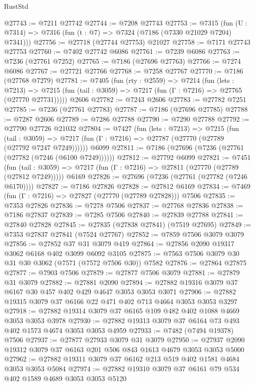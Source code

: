 \begin{lexlean}{RustStd}
\begin{coremodule}
{\begin{coremodule}
{{{{{{{{{{{{{{{{{{{{{{{{{{{{{{{{@27743 := @7211 @27742
@27744 := @7208 @27743
@27753 := @7315
    (fun (U : @7314) => @7316 (fun (t : @7) => @7324 (@7186 (@7330 @21029 @7204) @7341)))
@27756 := @27718 (@27744 @27753) @21027
@27758 := @7171 @27743 @27753
@27760 := @7402 @27742 @6086
@27761 := @7239 @6086
@27763 := @7236 (@27761 @7252)
@27765 := @7186 (@27696 @27763)
@27766 := @7274 @6086
@27767 := @27721 @27766
@27768 := @7258 @27767
@27770 := @7186 (@27768 @7279)
@27781 := @7405
    (fun (rty : @2559) =>
    @7214
      (fun (lets : @7213) =>
      @7215 (fun (tail : @3059) => @7217 (fun (Γ : @7216) => @27765 (@27770 @27731)))))
    @2606
@27782 := @7243 @2606
@27783 := @27782 @7251
@27785 := @7236 (@27761 @27783)
@27787 := @7186 (@27696 @27785)
@27788 := @7287 @2606
@27789 := @7286 @27788
@27790 := @7290 @27788
@27792 := @27790 @27726 @21032
@27804 := @7427
    (fun (lets : @7213) =>
    @7215
      (fun (tail : @3059) =>
      @7217 (fun (Γ : @7216) => @27787 (@27770 (@27789 (@27792 @7247 @7249))))))
    @6099
@27811 := @7186 (@27696 (@7236 (@27761 (@27782 (@7246 (@6100 @7249))))))
@27812 := @27792 @6099
@27821 := @7451
    (fun (tail : @3059) => @7217 (fun (Γ : @7216) => @27811 (@27770 (@27789 (@27812 @7249)))))
    @6169
@27826 := @27696 (@7236 (@27761 (@27782 (@7246 @6170))))
@27827 := @7186 @27826
@27828 := @27812 @6169
@27834 := @7469 (fun (Γ : @7216) => @27827 (@27770 (@27789 @27828))) @7506
@27835 := @7353 @27826
@27836 := @7278 @7506
@27837 := @27768 @27836
@27838 := @7186 @27837
@27839 := @7285 @7506
@27840 := @27839 @27788
@27841 := @27840 @27828
@27845 := @27835 (@27838 @27841) (@7519 @27695)
@27849 := @7353 @27837 @27841 (@7524 @27767)
@27852 := @7859 @7506 @3079 @3079
@27856 := @27852 @37 @31 @3079 @419
@27864 := @27856 @2090 @19317 @3062 @6168 @402 @3099 @6092 @3105
@27875 := @7563 @7506 @3079 @30 @31 @30 @3062 (@7571 (@7572 @7506 @30)) @7582
@27876 := @27864 @27875
@27877 := @7903 @7506
@27879 := @27877 @7506 @3079
@27881 := @27879 @31 @3079
@27882 := @27881 @2090
@27894 := @27882 @19316 @3079 @37 @6167 @30 @457 @402 @429 @4647 @3053 @3053 @3071
@27906 := @27882 @19315 @3079 @37 @6166 @22 @471 @402 @713 @4664 @3053 @3053 @3297
@27918 := @27882 @19314 @3079 @37 @6165 @109 @482 @402 @1088 @4669 @3053 @3053 @3978
@27930 := @27882 @19313 @3079 @37 @6164 @73 @493 @402 @1573 @4674 @3053 @3053 @4959
@27933 := @7482 (@7494 @19378) @7506
@27937 := @27877 @27933 @3079 @31 @3079
@27950 := @27937 @2090 @19312 @3079 @37 @6163 @201 @506 @843 @1613 @4679 @3053 @3053 @5000
@27962 := @27882 @19311 @3079 @37 @6162 @213 @519 @402 @1581 @4684 @3053 @3053 @5084
@27974 := @27882 @19310 @3079 @37 @6161 @79 @534 @402 @1589 @4689 @3053 @3053 @5120
}}}}}}}}}}}}}}}}}}}}}}}}}}}}}}}}
\end{coremodule}}
\end{coremodule}
\end{lexlean}
